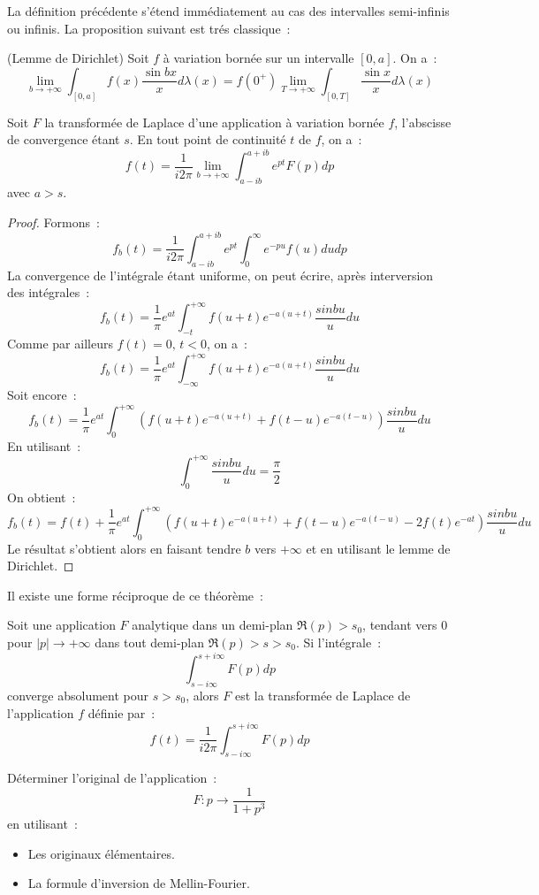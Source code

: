 La définition précédente s'étend immédiatement au cas des intervalles semi-infinis ou infinis.
La proposition suivant est trés classique~:
\begin{prop}(Lemme de Dirichlet)
Soit $f$ à variation bornée sur un intervalle $[0,a]$. On a~:
\[
\lim_{b \to +\infty} \int_[0,a] f(x) \frac{\sin bx}{x} d \lambda(x) =
f(0^+) \lim_{T \to +\infty} \int_[0,T] \frac{\sin x}{x} d \lambda(x)  
\]
\end{prop}
\begin{mandatory}
\begin{theorem}
Soit $F$ la transformée de Laplace d'une application à variation bornée $f$, l'abscisse
de convergence étant $s$. En tout point de continuité $t$ de $f$, on a~:
\[
f(t) = \frac{1}{i 2 \pi} \lim_{b \to + \infty} \int_{a-ib}^{a+ib}
e^{pt} F(p) dp
\]
avec $a > s$.
\end{theorem}
\end{mandatory}
\begin{proof}
Formons~:
\[
f_b(t) = \frac{1}{i 2 \pi}  \int_{a-ib}^{a+ib} e^{pt} \int_0^{\infty}
e^{-pu} f(u) du dp
\]
La convergence de l'intégrale étant uniforme, on peut écrire, après
interversion des intégrales~:
\[
f_b(t) = \frac{1}{\pi} e^{at} \int_{-t}^{+\infty} f(u+t)e^{-a(u+t)}
\frac{sin b u}{u} du
\]
Comme par ailleurs $f(t) = 0, \, t < 0$, on a~:
\[
f_b(t) = \frac{1}{\pi} e^{at} \int_{-\infty}^{+\infty} f(u+t)e^{-a(u+t)}
\frac{sin b u}{u} du
\]
Soit encore~:
\[
f_b(t) = \frac{1}{\pi} e^{at} \int_{0}^{+\infty} \left (
f(u+t)e^{-a(u+t)} + f(t-u)e^{-a(t-u)}
\right )
\frac{sin b u}{u} du
\]
En utilisant~:
\[
\int_0^{+\infty} \frac{sin b u}{u} du = \frac{\pi}{2}
\]
On obtient~:
\[
f_b(t) = f(t)  + \frac{1}{\pi} e^{at} \int_{0}^{+\infty} \left (
f(u+t)e^{-a(u+t)} + f(t-u)e^{-a(t-u)} - 2 f(t)e^{-at}
\right )
\frac{sin b u}{u} du
\]
Le résultat s'obtient alors en faisant tendre $b$ vers $+\infty$ et en utilisant le lemme de Dirichlet.
\end{proof} 
Il existe une forme réciproque de ce théorème~:
\begin{mandatory}
\begin{theorem}
Soit une application $F$ analytique dans un demi-plan $\Re(p) > s_0$,
tendant vers 0 pour $|p| \to +\infty$ dans tout demi-plan $\Re(p) > s
> s_0$. Si l'intégrale~:
\[
\int_{s-i \infty}^{s+i \infty} F(p) dp
\]
converge absolument pour $s > s_0$, alors $F$ est la transformée de
Laplace de l'application $f$ définie par~:
\[
f(t) = \frac{1}{i 2 \pi} \int_{s-i \infty}^{s+i \infty} F(p) dp
\]
\end{theorem}
\end{mandatory}
\begin{exercice}
Déterminer l'original de l'application~:
\[
F : p \to \frac{1}{1+p^3}
\]
en utilisant~:
\begin{itemize}
\item Les originaux élémentaires.
\item La formule d'inversion de Mellin-Fourier.
\end{itemize}
\end{exercice}